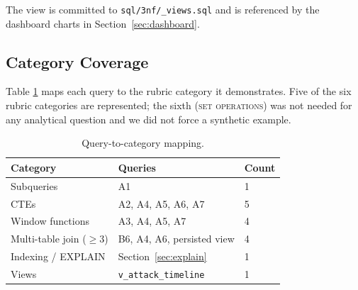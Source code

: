 The view is committed to \texttt{sql/3nf/\_views.sql} and is referenced
by the dashboard charts in Section~\ref{sec:dashboard}.

\subsection{Category Coverage}
Table \ref{tab:categories} maps each query to the rubric category it
demonstrates. Five of the six rubric categories are represented; the
sixth (\textsc{set operations}) was not needed for any analytical
question and we did not force a synthetic example.

\begin{table}[htbp]
\caption{Query-to-category mapping.}
\label{tab:categories}
\centering
\begin{tabular}{lll}
\toprule
\textbf{Category} & \textbf{Queries} & \textbf{Count} \\
\midrule
Subqueries           & A1                                   & 1 \\
CTEs                 & A2, A4, A5, A6, A7                   & 5 \\
Window functions     & A3, A4, A5, A7                       & 4 \\
Multi-table join (\(\geq 3\)) & B6, A4, A6, persisted view  & 4 \\
Indexing / EXPLAIN   & Section~\ref{sec:explain}            & 1 \\
Views                & \texttt{v\_attack\_timeline}         & 1 \\
\bottomrule
\end{tabular}
\end{table}
